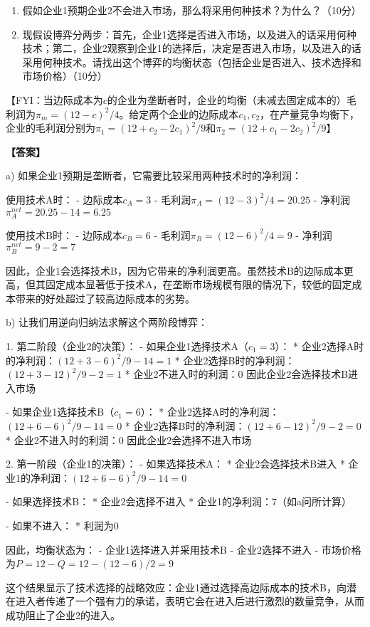 \documentclass[12pt]{article}
\begin{document}
\begin{enumerate}
\item 假如企业1预期企业2不会进入市场，那么将采用何种技术？为什么？（10分）

\item 现假设博弈分两步：首先，企业1选择是否进入市场，以及进入的话采用何种技术；第二，企业2观察到企业1的选择后，决定是否进入市场，以及进入的话采用何种技术。请找出这个博弈的均衡状态（包括企业是否进入、技术选择和市场价格）（10分）
\end{enumerate}

【FYI：当边际成本为$c$的企业为垄断者时，企业的均衡（未减去固定成本的）毛利润为$\pi_m=(12-c)^2/4$。给定两个企业的边际成本$c_1,c_2$，在产量竞争均衡下，企业的毛利润分别为$\pi_1=(12+c_2-2c_1)^2/9$和$\pi_2=(12+c_1-2c_2)^2/9$】

\noindent\textbf{【答案】}

a) 如果企业1预期是垄断者，它需要比较采用两种技术时的净利润：

使用技术A时：
- 边际成本$c_A=3$
- 毛利润$\pi_A=(12-3)^2/4=20.25$
- 净利润$\pi_A^{net}=20.25-14=6.25$

使用技术B时：
- 边际成本$c_B=6$
- 毛利润$\pi_B=(12-6)^2/4=9$
- 净利润$\pi_B^{net}=9-2=7$

因此，企业1会选择技术B，因为它带来的净利润更高。虽然技术B的边际成本更高，但其固定成本显著低于技术A，在垄断市场规模有限的情况下，较低的固定成本带来的好处超过了较高边际成本的劣势。

b) 让我们用逆向归纳法求解这个两阶段博弈：

1. 第二阶段（企业2的决策）：
   - 如果企业1选择技术A（$c_1=3$）：
     * 企业2选择A时的净利润：$(12+3-6)^2/9-14=1$
     * 企业2选择B时的净利润：$(12+3-12)^2/9-2=1$
     * 企业2不进入时的利润：0
     因此企业2会选择技术B进入市场

   - 如果企业1选择技术B（$c_1=6$）：
     * 企业2选择A时的净利润：$(12+6-6)^2/9-14=0$
     * 企业2选择B时的净利润：$(12+6-12)^2/9-2=0$
     * 企业2不进入时的利润：0
     因此企业2会选择不进入市场

2. 第一阶段（企业1的决策）：
   - 如果选择技术A：
     * 企业2会选择技术B进入
     * 企业1的净利润：$(12+6-6)^2/9-14=0$

   - 如果选择技术B：
     * 企业2会选择不进入
     * 企业1的净利润：$7$（如a问所计算）

   - 如果不进入：
     * 利润为0

因此，均衡状态为：
- 企业1选择进入并采用技术B
- 企业2选择不进入
- 市场价格为$P=12-Q=12-(12-6)/2=9$

这个结果显示了技术选择的战略效应：企业1通过选择高边际成本的技术B，向潜在进入者传递了一个强有力的承诺，表明它会在进入后进行激烈的数量竞争，从而成功阻止了企业2的进入。
\end{document}
